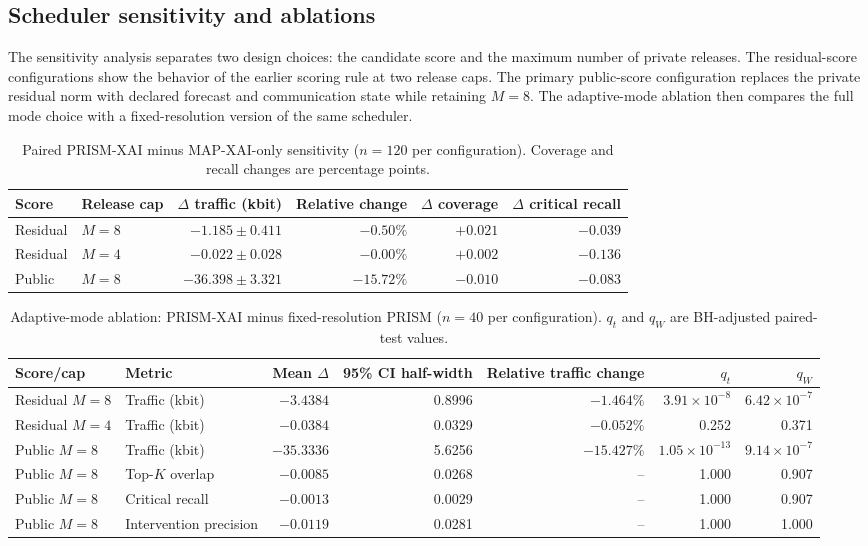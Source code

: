 \documentclass[10pt,conference]{IEEEtran}
\begin{document}
\subsection{Scheduler sensitivity and ablations}

The sensitivity analysis separates two design choices: the candidate score
and the maximum number of private releases. The residual-score configurations
show the behavior of the earlier scoring rule at two release caps. The primary
public-score configuration replaces the private residual norm with declared
forecast and communication state while retaining $M=8$. The adaptive-mode
ablation then compares the full mode choice with a fixed-resolution version of
the same scheduler.

\begin{table}[htbp]
\caption{Paired PRISM-XAI minus MAP-XAI-only sensitivity ($n=120$ per
configuration). Coverage and recall changes are percentage points.}
\label{tab:sensitivity}
\centering\small
\begin{tabular}{llrrrr}
\toprule
Score & Release cap & $\Delta$ traffic (kbit) & Relative change & $\Delta$ coverage & $\Delta$ critical recall\\ \midrule
Residual & $M=8$ & $-1.185\pm0.411$ & $-0.50\%$ & $+0.021$ & $-0.039$\\
Residual & $M=4$ & $-0.022\pm0.028$ & $-0.00\%$ & $+0.002$ & $-0.136$\\
Public & $M=8$ & $\mathbf{-36.398\pm3.321}$ & $\mathbf{-15.72\%}$ & $-0.010$ & $-0.083$\\
\bottomrule
\end{tabular}
\end{table}

\begin{table}[htbp]
\caption{Adaptive-mode ablation: PRISM-XAI minus fixed-resolution PRISM
($n=40$ per configuration). $q_t$ and $q_W$ are BH-adjusted paired-test values.}
\label{tab:ablation}
\centering\small
\begin{tabular}{llrrrrr}
\toprule
Score/cap & Metric & Mean $\Delta$ & 95\% CI half-width & Relative traffic change & $q_t$ & $q_W$\\ \midrule
Residual $M=8$ & Traffic (kbit) & $-3.4384$ & 0.8996 & $-1.464\%$ & $3.91\times10^{-8}$ & $6.42\times10^{-7}$\\
Residual $M=4$ & Traffic (kbit) & $-0.0384$ & 0.0329 & $-0.052\%$ & 0.252 & 0.371\\
Public $M=8$ & Traffic (kbit) & $-35.3336$ & 5.6256 & $-15.427\%$ & $1.05\times10^{-13}$ & $9.14\times10^{-7}$\\ \midrule
Public $M=8$ & Top-$K$ overlap & $-0.0085$ & 0.0268 & -- & 1.000 & 0.907\\
Public $M=8$ & Critical recall & $-0.0013$ & 0.0029 & -- & 1.000 & 0.907\\
Public $M=8$ & Intervention precision & $-0.0119$ & 0.0281 & -- & 1.000 & 1.000\\
\bottomrule
\end{tabular}
\end{table}
\end{document}
